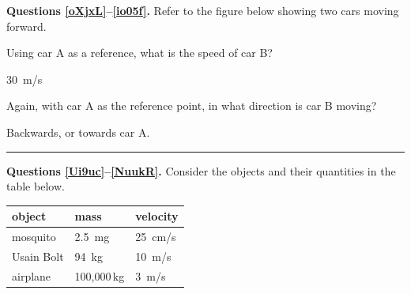 \documentclass[dvipsnames]{exam}
\begin{document}
\begin{questions}
\begin{EnvUplevel}
    \textbf{Questions \ref{oXjxL}--\ref{io05f}.} Refer to the figure below showing two cars moving forward.
\end{EnvUplevel}

\begin{center}
\end{center}

\question \label{oXjxL}
Using car A as a reference, what is the speed of car B?

\begin{solution}
    \SI{30}{m/s}
\end{solution}

\question \label{io05f}
Again, with car A as the reference point, in what direction is car B moving?

\begin{solution}
    Backwards, or towards car A.
\end{solution}

\bigskip
\hrule

\begin{EnvUplevel}
    \textbf{Questions \ref{Ui9uc}--\ref{NuukR}.} Consider the objects and their quantities in the table below.
\end{EnvUplevel}

\begin{center}
    \begin{tabular}{|l|l|l|}
        \hline
        \textbf{object} & \textbf{mass} & \textbf{velocity} \\ \hline
        mosquito & \SI{2.5}{mg} & \SI{25}{cm/s} \\ \hline
        Usain Bolt & \SI{94}{kg} & \SI{10}{m/s}\\ \hline
        airplane & 100,000\,kg & \SI{3}{m/s}\\ \hline
    \end{tabular}
\end{center}


\end{questions}
\end{document}
